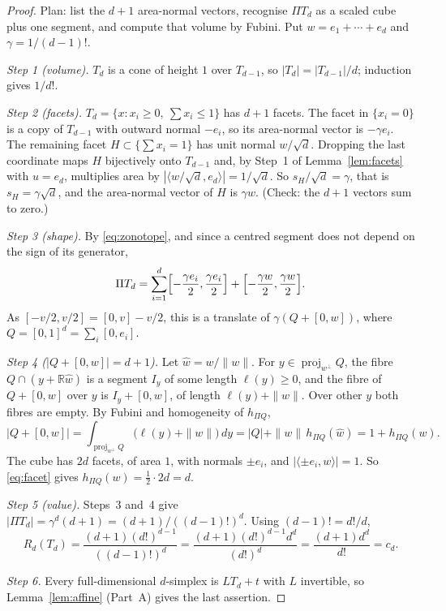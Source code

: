 \documentclass[11pt]{article}
\newcommand{\R}{\mathbb R}
\DeclareMathOperator{\proj}{proj}
\begin{document}
\begin{proof}
Plan: list the \(d+1\) area-normal vectors, recognise \(\Pi T_d\) as a scaled cube plus one segment, and compute that volume by Fubini. Put \(w=e_1+\cdots+e_d\) and \(\gamma=1/(d-1)!\).

\emph{Step 1 (volume).} \(T_d\) is a cone of height \(1\) over \(T_{d-1}\), so \(|T_d|=|T_{d-1}|/d\); induction gives \(1/d!\).

\emph{Step 2 (facets).} \(T_d=\{x:x_i\ge0,\ \sum x_i\le1\}\) has \(d+1\) facets. The facet in \(\{x_i=0\}\) is a copy of \(T_{d-1}\) with outward normal \(-e_i\), so its area-normal vector is \(-\gamma e_i\). The remaining facet \(H\subset\{\sum x_i=1\}\) has unit normal \(w/\sqrt d\). Dropping the last coordinate maps \(H\) bijectively onto \(T_{d-1}\) and, by Step~1 of Lemma~\ref{lem:facets} with \(u=e_d\), multiplies area by \(|\langle w/\sqrt d,e_d\rangle|=1/\sqrt d\). So \(s_H/\sqrt d=\gamma\), that is \(s_H=\gamma\sqrt d\), and the area-normal vector of \(H\) is \(\gamma w\). (Check: the \(d+1\) vectors sum to zero.)

\emph{Step 3 (shape).} By \eqref{eq:zonotope}, and since a centred segment does not depend on the sign of its generator,
\[
 \Pi T_d=\sum_{i=1}^d\Bigl[-\frac{\gamma e_i}2,\frac{\gamma e_i}2\Bigr]+\Bigl[-\frac{\gamma w}2,\frac{\gamma w}2\Bigr].
\]
As \([-v/2,v/2]=[0,v]-v/2\), this is a translate of \(\gamma(Q+[0,w])\), where \(Q=[0,1]^d=\sum_i[0,e_i]\).

\emph{Step 4 (\(|Q+[0,w]|=d+1\)).} Let \(\hat w=w/\|w\|\). For \(y\in\proj_{w^\perp}Q\), the fibre \(Q\cap(y+\R\hat w)\) is a segment \(I_y\) of some length \(\ell(y)\ge0\), and the fibre of \(Q+[0,w]\) over \(y\) is \(I_y+[0,w]\), of length \(\ell(y)+\|w\|\). Over other \(y\) both fibres are empty. By Fubini and homogeneity of \(h_{\Pi Q}\),
\[
 |Q+[0,w]|=\int_{\proj_{w^\perp}Q}\bigl(\ell(y)+\|w\|\bigr)\,dy
 =|Q|+\|w\|\,h_{\Pi Q}(\hat w)=1+h_{\Pi Q}(w).
\]
The cube has \(2d\) facets, of area \(1\), with normals \(\pm e_i\), and \(|\langle\pm e_i,w\rangle|=1\). So \eqref{eq:facet} gives \(h_{\Pi Q}(w)=\tfrac12\cdot2d=d\).

\emph{Step 5 (value).} Steps~3 and~4 give \(|\Pi T_d|=\gamma^d(d+1)=(d+1)/((d-1)!)^d\). Using \((d-1)!=d!/d\),
\[
 R_d(T_d)=\frac{(d+1)(d!)^{d-1}}{((d-1)!)^d}
 =\frac{(d+1)(d!)^{d-1}d^d}{(d!)^d}=\frac{(d+1)d^d}{d!}=c_d.
\]

\emph{Step 6.} Every full-dimensional \(d\)-simplex is \(LT_d+t\) with \(L\) invertible, so Lemma~\ref{lem:affine} (Part~A) gives the last assertion.
\end{proof}
\end{document}
